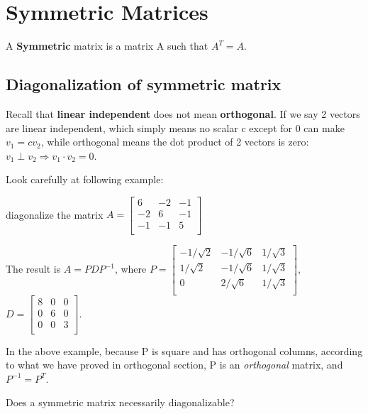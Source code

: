 \chapter{Symmetric Matrices}

\begin{definition}
    A \textbf{Symmetric} matrix is a matrix A such that $A^{T} = A$.
\end{definition}


\section{Diagonalization of symmetric matrix}

Recall that \textbf{linear independent} does not mean \textbf{orthogonal}. If we say 2 vectors are linear independent, which simply means no scalar c except for 0 can make $v_1 = c v_2$, while orthogonal means the dot product of 2 vectors is zero: $v_1 \perp v_2 \Rightarrow v_1 \cdot v_2 = 0$.

Look carefully at following example:
\begin{eg}
    diagonalize the matrix $A = \begin{bmatrix}
        6 & -2 & -1 \\
        -2 & 6 & -1 \\
        -1 & -1 & 5 \\
    \end{bmatrix}$

    The result is $A = PDP^{-1}$, where $P = \begin{bmatrix}
        -1/\sqrt{2} & -1/\sqrt{6} & 1/\sqrt{3} \\
        1/\sqrt{2} & -1/\sqrt{6} & 1/\sqrt{3} \\
        0 & 2/\sqrt{6} & 1/\sqrt{3} \\
    \end{bmatrix}$, $D = \begin{bmatrix}
        8 & 0 & 0 \\
        0 & 6 & 0 \\
        0 & 0 & 3 \\
    \end{bmatrix}$.
\end{eg}

In the above example, because P is square and has orthogonal columns, according to what we have proved in orthogonal section, P is an \textit{orthogonal} matrix, and $P^{-1} = P ^T$.


\begin{remark}
    Does a symmetric matrix necessarily diagonalizable?
\end{remark}

